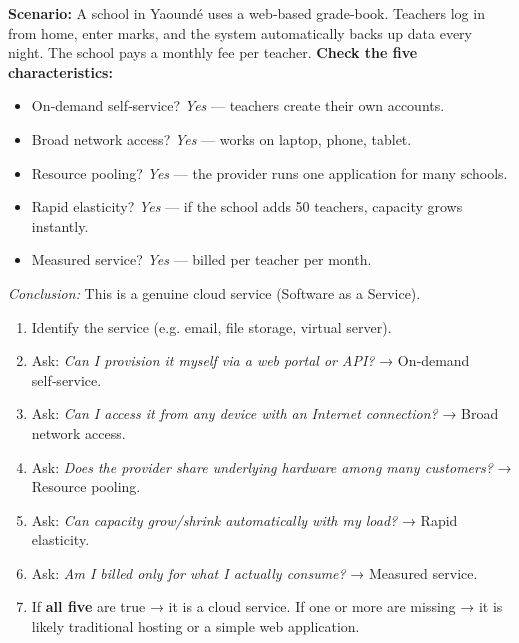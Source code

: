 \documentclass[11pt]{article}
\begin{document}
\begin{exemplebox}
\textbf{Scenario:} A school in Yaoundé uses a web‑based grade‑book. Teachers log in from home, enter marks, and the system automatically backs up data every night. The school pays a monthly fee per teacher.
\textbf{Check the five characteristics:}
\begin{itemize}
\item On‑demand self‑service? \emph{Yes} — teachers create their own accounts.
\item Broad network access? \emph{Yes} — works on laptop, phone, tablet.
\item Resource pooling? \emph{Yes} — the provider runs one application for many schools.
\item Rapid elasticity? \emph{Yes} — if the school adds 50 teachers, capacity grows instantly.
\item Measured service? \emph{Yes} — billed per teacher per month.
\end{itemize}
\emph{Conclusion:} This is a genuine cloud service (Software as a Service).
\end{exemplebox}

\begin{methode}
\begin{enumerate}
\item Identify the service (e.g. email, file storage, virtual server).
\item Ask: \emph{Can I provision it myself via a web portal or API?} → On‑demand self‑service.
\item Ask: \emph{Can I access it from any device with an Internet connection?} → Broad network access.
\item Ask: \emph{Does the provider share underlying hardware among many customers?} → Resource pooling.
\item Ask: \emph{Can capacity grow/shrink automatically with my load?} → Rapid elasticity.
\item Ask: \emph{Am I billed only for what I actually consume?} → Measured service.
\item If \textbf{all five} are true → it is a cloud service. If one or more are missing → it is likely traditional hosting or a simple web application.
\end{enumerate}
\end{methode}
\end{document}
